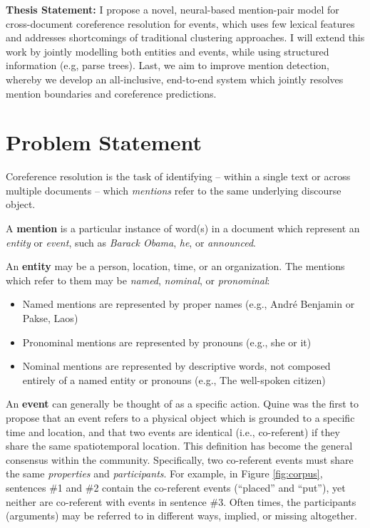 
\textbf{Thesis Statement:} I propose a novel, neural-based mention-pair model for cross-document coreference resolution for events, which uses few lexical features and addresses shortcomings of traditional clustering approaches.  I will extend this work by jointly modelling both entities and events, while using structured information (e.g, parse trees).  Last, we aim to improve mention detection, whereby we develop an all-inclusive, end-to-end system which jointly resolves mention boundaries and coreference predictions.

\vspace{20mm}
\section{Problem Statement}
Coreference resolution is the task of identifying -- within a single text or across multiple documents -- which \textit{mentions} refer to the same underlying discourse object. 

A \textbf{mention} is a particular instance of word(s) in a document which represent an \textit{entity} or \textit{event}, such as \textit{Barack Obama}, \textit{he}, or \textit{announced}.

An \textbf{entity} may be a person, location, time, or an organization.  The mentions which refer to them may be \textit{named}, \textit{nominal}, or \textit{pronominal}:
\begin{itemize}
\item Named mentions are represented by proper names (e.g., Andr\'e Benjamin or Pakse, Laos) 
\item Pronominal mentions are represented by pronouns (e.g., she or it)
\item Nominal mentions are represented by descriptive words, not composed entirely of a named entity or pronouns (e.g., The well-spoken citizen)
\end{itemize}

An \textbf{event} can generally be thought of as a specific action.  Quine \cite{quine1985} was the first to propose that an event refers to a physical object which is grounded to a specific time and location, and that two events are identical (i.e., co-referent) if they share the same spatiotemporal location.  This definition has become the general consensus within the community.  Specifically, two co-referent events must share the same \textit{properties} and \textit{participants}.  For example, in Figure \ref{fig:corpus}, sentences \#1 and \#2 contain the co-referent events (``placed'' and ``put''), yet neither are co-referent with events in sentence \#3.  Often times, the participants (arguments) may be referred to in different ways, implied, or missing altogether.

